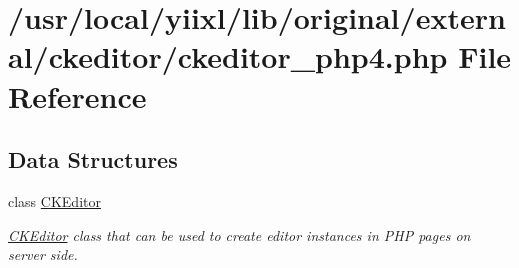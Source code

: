 \hypertarget{ckeditor__php4_8php}{
\section{/usr/local/yiixl/lib/original/external/ckeditor/ckeditor\_\-php4.php File Reference}
\label{ckeditor__php4_8php}
}
\subsection*{Data Structures}
\begin{DoxyCompactItemize}
\item 
class \hyperlink{classCKEditor}{CKEditor}
\begin{DoxyCompactList}\small\item\em \hyperlink{classCKEditor}{CKEditor} class that can be used to create editor instances in PHP pages on server side. \item\end{DoxyCompactList}\end{DoxyCompactItemize}
